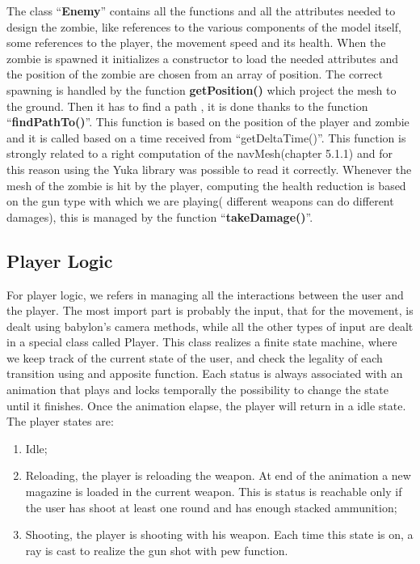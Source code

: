\documentclass[12pt,a4paper,oneside]{article}
\theoremstyle{definition}
\begin{document}
The class ``\textbf{Enemy}'' contains all the functions and all the attributes needed to design the zombie, like references to the various components of the model itself, some references to the player, the movement speed and its health. When the zombie is spawned it initializes a constructor to load the needed attributes and the position of the zombie are chosen from an array of position.
The correct spawning is handled by the function \textbf{getPosition()} which project the mesh to the ground.
Then it has to find a path , it is done thanks to the function ``\textbf{findPathTo()}''. This function is based on the position of the player and zombie and  it is called based on a time received from ``getDeltaTime()''. This function is strongly related to a right computation of the navMesh(chapter 5.1.1) and for this reason using the Yuka library was possible to read it correctly. Whenever the mesh of the zombie is hit by the player, computing the health reduction is based on the gun type with which we are playing( different weapons can do different damages), this is managed by the function ``\textbf{takeDamage()}''. \\


\subsection{Player Logic}

For player logic, we refers in managing all the interactions between the user and the player. The most import part is probably the input, that for the movement, is dealt using babylon's camera methods, while all the other types of input are dealt in a special class called Player. This class realizes a finite state machine, where we keep track of the current state of the user, and check the legality of each transition using and apposite function. Each status is always associated with an animation that plays and locks temporally the possibility to change the state until it finishes. Once the animation elapse, the player will return in a idle state. The player states are:
\begin{enumerate}
    \item Idle;
    \item Reloading, the player is reloading the weapon. At end of the animation a new magazine is loaded in the current weapon. This is status is reachable only if the user has shoot at least one round and has enough stacked ammunition;
    \item Shooting, the player is shooting with his weapon. Each time this state is on, a ray is cast to realize the gun shot with pew function.
\end{enumerate}
\end{document}
